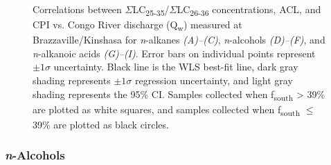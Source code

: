 \begin{figure}[p]
	\caption[Correlations between ACL, CPI, and discharge]{Correlations between $\Sigma$LC\textsubscript{25-35}/$\Sigma$LC\textsubscript{26-36} concentrations, ACL, and CPI vs. Congo River discharge (Q\textsubscript{w}) measured at Brazzaville/Kinshasa for \textit{n}-alkanes \textit{(A)--(C)}, \textit{n}-alcohols \textit{(D)--(F)}, and \textit{n}-alkanoic acids \textit{(G)--(I)}. Error bars on individual points represent $\pm 1 \sigma$ uncertainty. Black line is the WLS best-fit line, dark gray shading represents $\pm 1 \sigma$  regression uncertainty, and light gray shading represents the 95\% CI. Samples collected when f\textsubscript{south} > 39\% are plotted as white squares, and samples collected when f\textsubscript{south} $\leq$ 39\% are plotted as black circles.}
	\label{Ch4Fig:5} 
\end{figure}

\subsubsection{\textit{n}-Alcohols}

